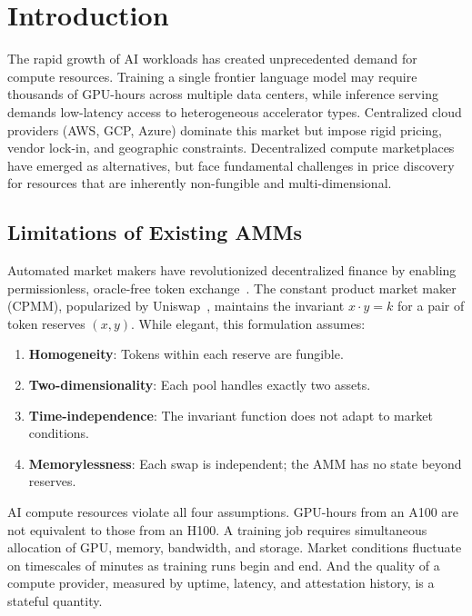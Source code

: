 \section{Introduction}

\label{sec:intro}

The rapid growth of AI workloads has created unprecedented demand for compute resources. Training a single frontier language model may require thousands of GPU-hours across multiple data centers, while inference serving demands low-latency access to heterogeneous accelerator types. Centralized cloud providers (AWS, GCP, Azure) dominate this market but impose rigid pricing, vendor lock-in, and geographic constraints. Decentralized compute marketplaces~\cite{golem2016,akash2020,rendernetwork2021} have emerged as alternatives, but face fundamental challenges in price discovery for resources that are inherently non-fungible and multi-dimensional.

\subsection{Limitations of Existing AMMs}

Automated market makers have revolutionized decentralized finance by enabling permissionless, oracle-free token exchange~\cite{adams2020uniswap,egorov2019stableswap,martinelli2019balancer}. The constant product market maker (CPMM), popularized by Uniswap~\cite{adams2021uniswapv3}, maintains the invariant $x \cdot y = k$ for a pair of token reserves $(x, y)$. While elegant, this formulation assumes:

\begin{enumerate}[leftmargin=1.4em]
    \item \textbf{Homogeneity}: Tokens within each reserve are fungible.
    \item \textbf{Two-dimensionality}: Each pool handles exactly two assets.
    \item \textbf{Time-independence}: The invariant function does not adapt to market conditions.
    \item \textbf{Memorylessness}: Each swap is independent; the AMM has no state beyond reserves.
\end{enumerate}

AI compute resources violate all four assumptions. GPU-hours from an A100 are not equivalent to those from an H100. A training job requires simultaneous allocation of GPU, memory, bandwidth, and storage. Market conditions fluctuate on timescales of minutes as training runs begin and end. And the quality of a compute provider, measured by uptime, latency, and attestation history, is a stateful quantity.

